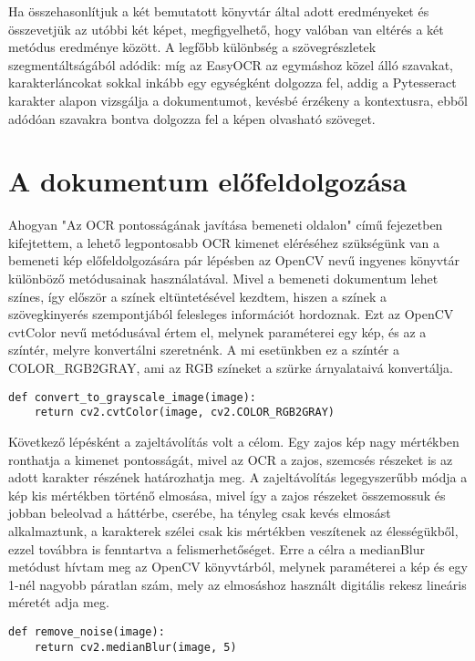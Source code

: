 \documentclass[12pt]{report}
\begin{document}
Ha összehasonlítjuk a két bemutatott könyvtár által adott eredményeket és összevetjük az utóbbi két képet, megfigyelhető, hogy valóban van eltérés a két metódus eredménye között. A legfőbb különbség a szövegrészletek szegmentáltságából adódik: míg az EasyOCR az egymáshoz közel álló szavakat, karakterláncokat sokkal inkább egy egységként dolgozza fel, addig a Pytesseract karakter alapon vizsgálja a dokumentumot, kevésbé érzékeny a kontextusra, ebből adódóan szavakra bontva dolgozza fel a képen olvasható szöveget.

\section{A dokumentum előfeldolgozása}

Ahogyan "Az OCR pontosságának javítása bemeneti oldalon" című fejezetben kifejtettem, a lehető legpontosabb OCR kimenet eléréséhez szükségünk van a bemeneti kép előfeldolgozására pár lépésben az OpenCV nevű ingyenes könyvtár különböző metódusainak használatával.
Mivel a bemeneti dokumentum lehet színes, így először a színek eltüntetésével kezdtem, hiszen a színek a szövegkinyerés szempontjából felesleges információt hordoznak. Ezt az OpenCV cvtColor nevű metódusával értem el, melynek paraméterei egy kép, és az a színtér, melyre konvertálni szeretnénk. A mi esetünkben ez a színtér a COLOR\_RGB2GRAY, ami az RGB színeket a szürke árnyalataivá konvertálja.

\begin{verbatim}
def convert_to_grayscale_image(image):
    return cv2.cvtColor(image, cv2.COLOR_RGB2GRAY)
\end{verbatim}

Következő lépésként a zajeltávolítás volt a célom. Egy zajos kép nagy mértékben ronthatja a kimenet pontosságát, mivel az OCR a zajos, szemcsés részeket is az adott karakter részének határozhatja meg. A zajeltávolítás legegyszerűbb módja a kép kis mértékben történő elmosása, mivel így a zajos részeket összemossuk és jobban beleolvad a háttérbe, cserébe, ha tényleg csak kevés elmosást alkalmaztunk, a karakterek szélei csak kis mértékben veszítenek az élességükből, ezzel továbbra is fenntartva a felismerhetőséget.
Erre a célra a medianBlur metódust hívtam meg az OpenCV könyvtárból, melynek paraméterei a kép és egy 1-nél nagyobb páratlan szám, mely az elmosáshoz használt digitális rekesz lineáris méretét adja meg.

\begin{verbatim}
def remove_noise(image):
    return cv2.medianBlur(image, 5)
\end{verbatim}
\end{document}
